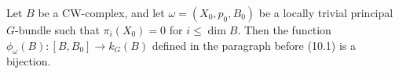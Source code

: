 Let $B$ be a CW-complex, and let $\omega = (X_0, p_0, B_0)$ be a locally trivial principal $G$-bundle such that $\pi_i(X_0) = 0$ for $i \leq \dim B$. Then the function $\phi_\omega(B): [B, B_0] \rightarrow k_G(B)$ defined in the paragraph before (10.1) is a bijection.
